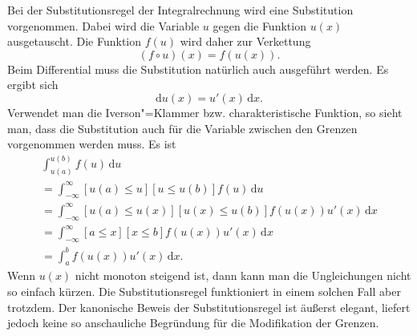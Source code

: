 \documentclass[a4paper,11pt,fleqn,twocolumn,twoside]{scrartcl}
\numberwithin{equation}{section}
\begin{document}
Bei der Substitutionsregel der Integralrechnung wird eine
Substitution vorgenommen. Dabei wird die Variable $u$ gegen die Funktion
$u(x)$ ausgetauscht. Die Funktion $f(u)$ wird daher zur
Verkettung
\begin{equation}
(f\circ u)(x) = f(u(x)).
\end{equation}
Beim Differential muss die Substitution natürlich auch ausgeführt
werden. Es ergibt sich
\begin{equation}
\mathrm du(x) = u'(x)\,\mathrm dx.
\end{equation}
Verwendet man die Iverson"=Klammer bzw. charakteristische Funktion,
so sieht man, dass die Substitution auch für die Variable zwischen
den Grenzen vorgenommen werden muss. Es ist
\begin{gather*}
\int_{u(a)}^{u(b)} f(u)\,\mathrm du\\
= \int_{-\infty}^{\infty} [u(a)\le u][u\le u(b)] f(u)\,\mathrm du\\
= \int_{-\infty}^{\infty} [u(a)\le u(x)][u(x) \le u(b)] f(u(x))u'(x)\,\mathrm dx\\
= \int_{-\infty}^{\infty} [a\le x][x\le b] f(u(x)) u'(x)\,\mathrm dx\\
= \int_a^b f(u(x))u'(x)\,\mathrm dx.
\end{gather*}
Wenn $u(x)$ nicht monoton steigend ist, dann kann man die
Ungleichungen nicht so einfach kürzen. Die Substitutionsregel
funktioniert in einem solchen Fall aber trotzdem. Der kanonische
Beweis der Substitutionsregel ist äußerst elegant, liefert jedoch
keine so anschauliche Begründung für die Modifikation der Grenzen.
\end{document}
